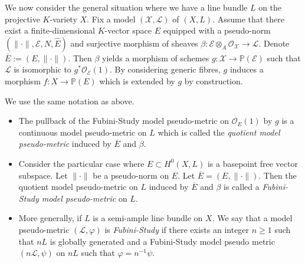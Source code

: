 \documentclass [11pt,reqno]{amsart}
\newcommand{\1}{\mathmybb{1}}
\def\cE{{\mathcal{E}}}
\def\cL{{\mathcal{L}}}
\def\cO{{\mathcal{O}}}
\def\cX{{\mathcal{X}}}
\begin{document}
We now consider the general situation where we have a line bundle $L$ on the projective $K$-variety $X$. Fix a model $(\cX,\cL)$ of $(X,L)$. Assume that there exist a finite-dimensional $K$-vector space $E$ equipped with a pseudo-norm $(\|\cdot\|,\cE,N,\widehat{E})$ and surjective morphism of sheaves $\beta : \cE \otimes_{A} \cO_{\cX} \to \cL$. Denote $\overline{E}:=(E,\|\cdot\|)$. Then $\beta$ yields a morphism of schemes $g : \cX \to \mathbb{P}(\cE)$ such that $\cL$ is isomorphic to $g^{\ast}\cO_{\cE}(1)$. By considering generic fibres, $g$ induces a morphism $f : X \to \mathbb{P}(E)$ which is extended by $g$ by construction. 

\begin{definition}
\label{def:quotient_local_model_pseudo-metric}
We use the same notation as above. 
\begin{itemize}
	\item[(1)] The pullback of the Fubini-Study model pseudo-metric on $\cO_{E}(1)$ by $g$ is a continuous model pseudo-metric on $L$ which is called the \emph{quotient model pseudo-metric} induced by $\overline{E}$ and $\beta$. 
	\item[(2)] Consider the particular case where $E\subset H^{0}(X,L)$ is a basepoint free vector subspace. Let $\|\cdot\|$ be a pseudo-norm on $E$. Let $\overline{E}=(E,\|\cdot\|)$. Then the quotient model pseudo-metric on $L$ induced by $\overline{E}$ and $\beta$ is called a \emph{Fubini-Study model pseudo-metric} on $L$.
	\item[(3)] More generally, if $L$ is a semi-ample line bundle on $X$. We say that a model pseudo-metric $(\cL,\varphi)$ is \emph{Fubini-Study} if there exists an integer $n\geq 1$ such that $nL$ is globally generated and a Fubini-Study model pseudo metric $(n\cL,\psi)$ on $nL$  such that $\varphi=n^{-1}\psi$. 
\end{itemize}
\end{definition} 
\end{document}
